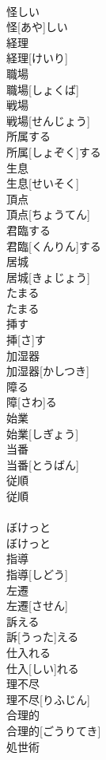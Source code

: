 \documentclass[8pt]{extreport}
\begin{document}
\begin{CJK}{UTF8}{min}
\\	怪しい	
\\	怪[あや]しい	
\\	経理	
\\	経理[けいり]	
\\	職場	
\\	職場[しょくば]	
\\	戦場	
\\	戦場[せんじょう]	
\\	所属する	
\\	所属[しょぞく]する	
\\	生息	
\\	生息[せいそく]	
\\	頂点	
\\	頂点[ちょうてん]	
\\	君臨する	
\\	君臨[くんりん]する	
\\	居城	
\\	居城[きょじょう]	
\\	たまる	
\\	たまる	
\\	挿す	
\\	挿[さ]す	
\\	加湿器	
\\	加湿器[かしつき]	
\\	障る	
\\	障[さわ]る	
\\	始業	
\\	始業[しぎょう]	
\\	当番	
\\	当番[とうばん]	
\\	従順	
\\	従順
\\	[じゅうじゅん]	
\\	ぼけっと	
\\	ぼけっと	
\\	指導	
\\	指導[しどう]	
\\	左遷	
\\	左遷[させん]	
\\	訴える	
\\	訴[うった]える	
\\	仕入れる	
\\	仕入[しい]れる	
\\	理不尽	
\\	理不尽[りふじん]	
\\	合理的	
\\	合理的[ごうりてき]	
\\	処世術	

\end{CJK}
\end{document}
